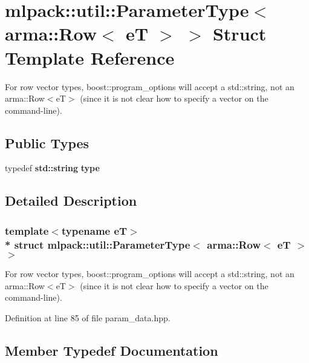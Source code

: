 \section{mlpack\+:\+:util\+:\+:Parameter\+Type$<$ arma\+:\+:Row$<$ eT $>$ $>$ Struct Template Reference}
\label{structmlpack_1_1util_1_1ParameterType_3_01arma_1_1Row_3_01eT_01_4_01_4}


For row vector types, boost\+::program\+\_\+options will accept a std\+::string, not an arma\+::\+Row$<$e\+T$>$ (since it is not clear how to specify a vector on the command-\/line).  


\subsection*{Public Types}
\begin{DoxyCompactItemize}
\item 
typedef {\bf std\+::string} {\bf type}
\end{DoxyCompactItemize}


\subsection{Detailed Description}
\subsubsection*{template$<$typename eT$>$\\*
struct mlpack\+::util\+::\+Parameter\+Type$<$ arma\+::\+Row$<$ e\+T $>$ $>$}

For row vector types, boost\+::program\+\_\+options will accept a std\+::string, not an arma\+::\+Row$<$e\+T$>$ (since it is not clear how to specify a vector on the command-\/line). 

Definition at line 85 of file param\+\_\+data.\+hpp.



\subsection{Member Typedef Documentation}
